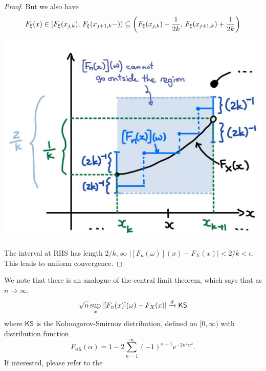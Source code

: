 \begin{unexaminable}
\begin{proof}
But we also have 
\begin{equation*}
F_\xi(x) \in \left[ F_\xi(x_{j,k}), \,  F_\xi(x_{j+1,k}-) \right) \subseteq \left( F_\xi(x_{j,k})-\frac{1}{2k}, \,  F_\xi(x_{j+1,k})+\frac{1}{2k} \right)
\end{equation*}

\begin{center}
\includegraphics[scale=0.3]{figures/Fig1.3.jpg}
\end{center}
\captionof{figure}{The bound of $[F_n(\omega)](x)$ (labelled as $[F_n(x)](\omega)$) for $x \in [x_{j,k}, x_{j,k+1})$}
\vspace{12pt}
The interval at RHS has length $2/k$, so $|[F_n(\omega)](x) - F_X(x)| < 2/k < \epsilon$. This leads to uniform convergence.
\end{proof}

\begin{remark}
We note that there is an analogue of the central limit theorem, which says that as $n \to \infty$,
\begin{equation}
\sqrt{n} \sup_x \left| [F_n(x)](\omega) - F_X(x) \right| \xrightarrow{d} \mathsf{KS} 
\end{equation}
where $\mathsf{KS}$ is the Kolmogorov-Smirnov distribution, defined on $[0,\infty)$ with distribution function
\begin{equation}
F_{\mathsf{KS}}(\alpha) = 1-2 \sum_{n=1}^\infty (-1)^{n+1} e^{-2n^2\alpha^2}.
\end{equation}
If interested, please refer to the 
\end{remark}
\end{unexaminable}

